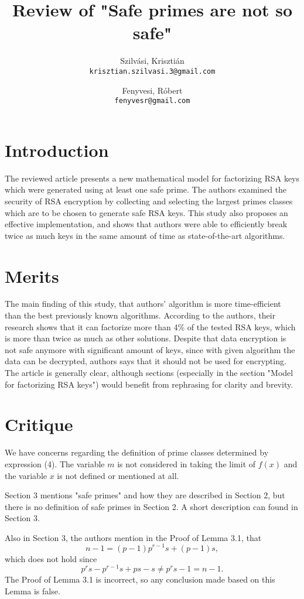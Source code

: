 \documentclass[11 pt,a4paper,english]{article}
\title{Review of "Safe primes are not so safe"}
\author{
	Szilvási, Krisztián\\
	\texttt{krisztian.szilvasi.3@gmail.com}
	\and
	Fenyvesi, Róbert\\
	\texttt{fenyvesr@gmail.com}
}
\begin{document}
\maketitle

\newpage

\section{Introduction}
The reviewed article \cite{safeprimes} presents a new mathematical model for factorizing RSA keys which were generated using at least one safe prime. 
The authors examined the security of RSA encryption by collecting and selecting the largest primes classes which are to be chosen to generate safe RSA keys. 
This study also proposes an effective implementation, and shows that authors were able to efficiently break twice as much keys in the same amount of time as state-of-the-art algorithms. 


\section{Merits}
The main finding of this study, that authors' algorithm is more time-efficient than the best previously known algorithms. According to the authors, their research shows that it can factorize more than 4\% of the tested RSA keys, which is more than twice as much as other solutions. 
Despite that data encryption is not safe anymore with significant amount of keys, since with given algorithm the data can be decrypted, authors says that it should not be used for encrypting. 
The article is generally clear, although sections (especially in the section "Model for factorizing RSA keys") would benefit from rephrasing for clarity and brevity.


\section{Critique}

We have concerns regarding the definition of prime classes determined by expression (4). The variable $m$ is not considered in taking the limit of $f(x)$ and the variable $x$ is not defined or mentioned at all.

Section 3 mentions "safe primes" and how they are described in Section 2, but there is no definition of safe primes in Section 2. A short description can found in Section 3.

Also in Section 3, the authors mention in the Proof of Lemma 3.1, that $$n-1=(p-1)p^{r-1}s+(p-1)s,$$ which does not hold since $$p^rs-p^{r-1}s+ps-s \neq p^rs-1=n-1.$$ The Proof of Lemma 3.1 is incorrect, so any conclusion made based on this Lemma is false.
\end{document}
